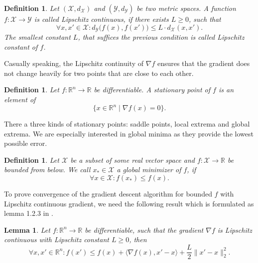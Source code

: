 \documentclass[11pt, a4paper]{article}
\newtheorem{lemma}[theorem]{Lemma}
\newtheorem{definition}[theorem]{Definition}
\newcommand{\R}{\mathbb{R}}
\newcommand{\X}{\mathcal{X}}
\newcommand{\Y}{\mathcal{Y}}
\begin{document}
\begin{definition}
Let $(\X,d_{\X})$ and $(\Y, d_{\Y})$ be two metric spaces. A function $f: \X \to \Y$ is called Lipschitz continuous, if there exists $L \geq 0$, such that
\[ \forall x,x' \in \X : d_{\Y} \big ( f(x) , f(x') \big ) \leq L \cdot d_{\X}(x,x'). \]
The smallest constant $L$, that suffices the previous condition is called Lipschitz constant of $f$.
\end{definition}

Casually speaking, the Lipschitz continuity of $\nabla f$ ensures that the gradient does not change heavily for two points that are close to each other.

\begin{definition}
Let $f: \R^n \to \R$ be differentiable. A stationary point of $f$ is an element of
\[ \big \{ x \in \R^n \mid \nabla f(x) = 0 \big \}. \]
\end{definition}

There a three kinds of stationary points: saddle points, local extrema and global extrema. We are especially interested in global minima as they provide the lowest possible error.

\begin{definition}
Let $\X$ be a subset of some real vector space and $f: \X \to \R$ be bounded from below. We call $x_* \in \X$ a global minimizer of $f$, if
\[ \forall x \in \X : f(x_*) \leq f(x). \]
\end{definition}

To prove convergence of the gradient descent algorithm for bounded $f$ with Lipschitz continuous gradient, we need the following result which is formulated as lemma 1.2.3 in \cite{ConvexOptimization}.

\begin{lemma} \label{lem:descent}
Let $f: \R^n \to \R$ be differentiable, such that the gradient $\nabla f$ is Lipschitz continuous with Lipschitz constant $L \geq 0$, then
\[ \forall x,x' \in \R^n : f(x') \leq f(x) + \big \langle \nabla f(x) , x' -x \big \rangle + \frac{L}{2} \big \| x'- x \big \|_2^2. \]
\end{lemma}
\end{document}
